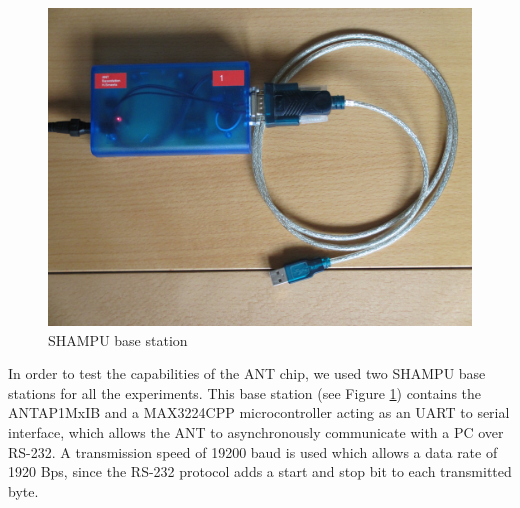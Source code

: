 \begin{figure}[H]
	\centering
	\includegraphics[scale=.5]{content/images/SHAMPUbase.JPG}
	\caption{SHAMPU base station}\label{fig:shampubase}
\end{figure}
In order to test the capabilities of the ANT chip, we used two SHAMPU base stations for all the experiments. This base station (see Figure \ref{fig:shampubase}) contains the ANTAP1MxIB and a MAX3224CPP microcontroller acting as an UART to serial interface, which allows the ANT to asynchronously communicate with a PC over RS-232. A transmission speed of 19200 baud is used which allows a data rate of 1920 Bps, since the RS-232 protocol adds a start and stop bit to each transmitted byte\cite{RS232}.
